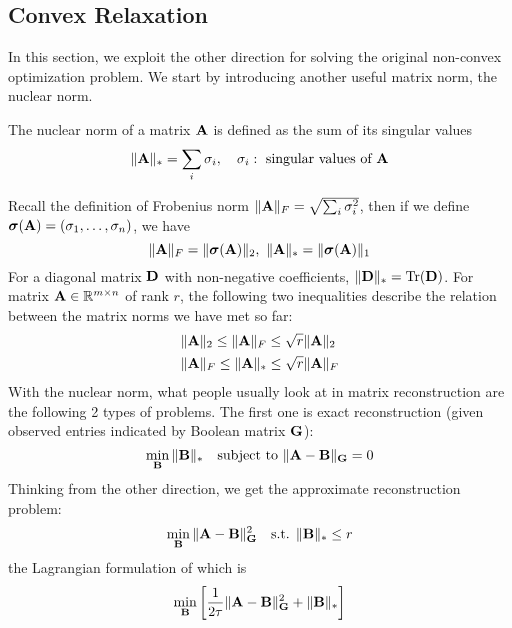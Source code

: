 \documentclass[../main.tex]{subfiles}
\begin{document}
\subsection{Convex Relaxation}
In this section, we exploit the other direction for solving the original non-convex optimization problem. We start by introducing another useful matrix norm, the nuclear norm.
\begin{definition}
	The nuclear norm of a matrix ${\bf A}$ is defined as the sum of its singular values
	\begin{equation*}
	\|{\bf A}\|_*=\sum_{i}\sigma_i,\quad \sigma_i:\text{ singular values of }{\bf A}
	\end{equation*}
\end{definition}
Recall the definition of Frobenius norm $\|{\bf A}\|_F=\sqrt{\sum_{i}\sigma_i^2}$, then if we define $\bm{\sigma}({\bf A})=(\sigma_1,\dots,\sigma_n)$, we have
\begin{equation*}
\|{\bf A}\|_F = \|\bm{\sigma}({\bf A})\|_2,\ \|{\bf A}\|_*=\|\bm{\sigma}({\bf A})\|_1
\end{equation*}
For a diagonal matrix ${\bf D}$ with non-negative coefficients, $\|{\bf D}\|_*=\text{Tr}({\bf D})$. For matrix ${\bf A}\in\mathbb{R}^{m\times n}$ of rank $r$, the following two inequalities describe the relation between the matrix norms we have met so far:
\begin{align*}
&\|{\bf A}\|_2\leq \|{\bf A}\|_F\leq \sqrt{r}\|{\bf A}\|_2\\
&\|{\bf A}\|_F\leq \|{\bf A}\|_*\leq \sqrt{r}\|{\bf A}\|_F
\end{align*} 
With the nuclear norm, what people usually look at in matrix reconstruction are the following 2 types of problems. The first one is exact reconstruction (given observed entries indicated by Boolean matrix ${\bf G}$):
\begin{equation*}
\min_{{\bf B}}\|{\bf B}\|_*\quad \text{subject to }\|{\bf A} - {\bf B}\|_{\bf G}=0
\end{equation*}
Thinking from the other direction, we get the approximate reconstruction problem:
\begin{equation*}
\min_{{\bf B}}\|{\bf A} - {\bf B}\|_{\bf G}^2 \quad \text{s.t. }\|{\bf B}\|_*\leq r
\end{equation*}
the Lagrangian formulation of which is
\begin{equation*}
\min_{{\bf B}}\left[\frac{1}{2\tau}\|{\bf A} - {\bf B}\|_{\bf G}^2 +\|{\bf B}\|_*\right]
\end{equation*}
\end{document}

